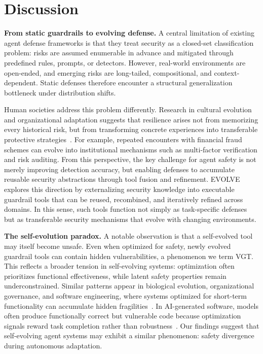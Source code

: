 \section{Discussion}
\label{sec:discussion}

\textbf{From static guardrails to evolving defense.}
A central limitation of existing agent defense frameworks is that they treat security as a closed-set classification problem: risks are assumed enumerable in advance and mitigated through predefined rules, prompts, or detectors. However, real-world environments are open-ended, and emerging risks are long-tailed, compositional, and context-dependent. Static defenses therefore encounter a structural generalization bottleneck under distribution shifts.

Human societies address this problem differently. Research in cultural evolution and organizational adaptation suggests that resilience arises not from memorizing every historical risk, but from transforming concrete experiences into transferable protective strategies~\citep{boyd1988culture,henrich2015secret,weick2011managing}. For example, repeated encounters with financial fraud schemes can evolve into institutional mechanisms such as multi-factor verification and risk auditing. From this perspective, the key challenge for agent safety is not merely improving detection accuracy, but enabling defenses to accumulate reusable security abstractions through tool fusion and refinement. EVOLVE explores this direction by externalizing security knowledge into executable guardrail tools that can be reused, recombined, and iteratively refined across domains. In this sense, such tools function not simply as task-specific defenses but as transferable security mechanisms that evolve with changing environments.

\textbf{The self-evolution paradox.}
A notable observation is that a self-evolved tool may itself become unsafe. Even when optimized for safety, newly evolved guardrail tools can contain hidden vulnerabilities, a phenomenon we term VGT. This reflects a broader tension in self-evolving systems: optimization often prioritizes functional effectiveness, while latent safety properties remain underconstrained. Similar patterns appear in biological evolution, organizational governance, and software engineering, where systems optimized for short-term functionality can accumulate hidden fragilities~\citep{taleb2012things,weick2011managing,khoury2023secure}. In AI-generated software, models often produce functionally correct but vulnerable code because optimization signals reward task completion rather than robustness~\cite{peng2025correct}. Our findings suggest that self-evolving agent systems may exhibit a similar phenomenon: safety divergence during autonomous adaptation.

